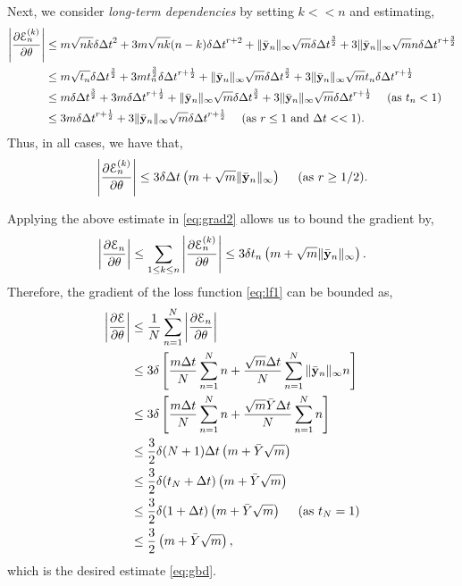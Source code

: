 \documentclass{article} \usepackage{iclr2021_conference,times}
\newcommand{\by}{{\bf y}}
\newcommand{\Dt}{{\Delta t}}
\newcommand{\E}{\EuScript{E}}
\begin{document}
Next, we consider \emph{long-term dependencies} by setting $k << n$ and estimating,
 \begin{equation}
\label{eq:norm4}
\begin{aligned}
\left | \frac{\partial \E^{(k)}_n}{\partial \theta} \right | &\leq m\sqrt{nk}\delta \Dt^2 + 3m\sqrt{nk}(n-k)\delta \Dt^{r+2} + \|\bar{\by}_n\|_\infty\sqrt{m}\delta \Dt^{\frac{3}{2}} + 3\|\bar{\by}_n\|_\infty\sqrt{m}n\delta \Dt^{r+\frac{3}{2}}\\
&\leq m\sqrt{t_n} \delta \Dt^{\frac{3}{2}} + 3m t_n^{\frac{3}{2}} \delta \Dt^{r + \frac{1}{2}} + \|\bar{\by}_n\|_\infty\sqrt{m}\delta \Dt^{\frac{3}{2}} + 3\|\bar{\by}_n\|_\infty\sqrt{m}t_n\delta \Dt^{r+\frac{1}{2}} \\
&\leq  m \delta \Dt^{\frac{3}{2}} + 3m \delta \Dt^{r + \frac{1}{2}}  +\|\bar{\by}_n\|_\infty\sqrt{m}\delta \Dt^{\frac{3}{2}} + 3\|\bar{\by}_n\|_\infty\sqrt{m}\delta \Dt^{r+\frac{1}{2}}  \quad ~({\rm as}~t_n < 1)\\
&\leq 3 m  \delta \Dt^{r + \frac{1}{2}} + 3\|\bar{\by}_n\|_\infty \sqrt{m} \delta \Dt^{r+\frac{1}{2}}\quad ~({\rm as}~r\leq 1~{\rm and}~\Dt << 1).
\end{aligned}
\end{equation}
Thus, in all cases, we have that,
 \begin{equation}
\label{eq:norm5}
\left | \frac{\partial \E^{(k)}_n}{\partial \theta} \right | \leq 3 \delta \Dt\left(m + \sqrt{m}\|\bar{\by}_n\|_\infty\right) \quad ~({\rm as}~ r\geq 1/2).
\end{equation}

Applying the above estimate in \eqref{eq:grad2} allows us to bound the gradient by,
\begin{equation}
\label{eq:norm6}
\left | \frac{\partial \E_n}{\partial \theta} \right | \leq \sum\limits_{1 \leq k \leq n} \left | \frac{\partial \E^{(k)}_n}{\partial \theta} \right | \leq  3\delta t_n\left(m + \sqrt{m}\|\bar{\by}_n\|_\infty\right)  . 
\end{equation}
Therefore, the gradient of the loss function \eqref{eq:lf1} can be bounded as,
\begin{equation}
\label{eq:norm}
\begin{aligned}
\left | \frac{\partial \E}{\partial \theta} \right | &\leq \frac{1}{N} \sum_{n=1}^N  \left | \frac{\partial \E_n}{\partial \theta} \right | \\
&\leq 3 \delta \left[ \frac{m\Dt}{N}\sum_{n=1}^N n + \frac{\sqrt{m}\Dt}{N}\sum_{n=1}^N\|\bar{\by}_n\|_{\infty}n\right] \\
&\leq 3 \delta \left[ \frac{m\Dt}{N}\sum_{n=1}^N n + \frac{\sqrt{m}\bar{Y}\Dt}{N}\sum_{n=1}^N n\right] \\
&\leq  \frac{3}{2} \delta (N+1)\Dt \left(m + \bar{Y} \sqrt{m}\right)  \\
&\leq \frac{3}{2} \delta (t_N + \Dt) \left(m + \bar{Y} \sqrt{m}\right) \\
&\leq \frac{3}{2} \delta (1 + \Dt) \left(m + \bar{Y} \sqrt{m}\right)\quad~({\rm as}~t_N=1) \\
&\leq \frac{3}{2}\left(m + \bar{Y} \sqrt{m}\right),
\end{aligned}
\end{equation}
which is the desired estimate \eqref{eq:gbd}. 
\end{document}
